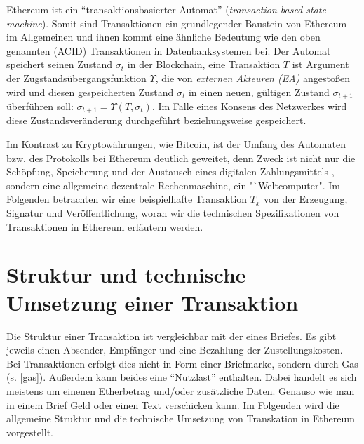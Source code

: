 \documentclass[runningheads]{llncs}
\begin{document}
Ethereum ist ein "`transaktionsbasierter Automat"' (\textit{transaction-based state machine}). Somit sind Transaktionen ein grundlegender Baustein von Ethereum im Allgemeinen und ihnen kommt eine ähnliche Bedeutung wie den oben genannten (ACID) Transaktionen in Datenbanksystemen bei. Der Automat speichert seinen Zustand $ \sigma_t $ in der Blockchain, eine Transaktion $ T $ ist Argument der Zugstandsübergangsfunktion $ \Upsilon $, die von \textit{externen Akteuren (EA)} angestoßen wird und diesen gespeicherten Zustand $ \sigma_t $ in einen neuen, gültigen Zustand $ \sigma_{t + 1} $ überführen soll: $\sigma_{t+1} = \Upsilon(T, \sigma_t) $. Im Falle eines Konsens des Netzwerkes wird diese Zustandsveränderung durchgeführt beziehungsweise gespeichert.

Im Kontrast zu Kryptowährungen, wie Bitcoin, ist der Umfang des Automaten bzw. des Protokolls bei Ethereum deutlich geweitet, denn Zweck ist nicht nur die Schöpfung, Speicherung und der Austausch eines digitalen Zahlungsmittels \cite{nakamoto_bitcoin_nodate}, sondern eine allgemeine dezentrale Rechenmaschine, ein "`Weltcomputer".  \cite[S. 1-4]{wood_ethereum/yellowpaper_2019} Im Folgenden betrachten wir eine beispielhafte Transaktion $ T_x $ von der Erzeugung, Signatur und Veröffentlichung, woran wir die technischen Spezifikationen von Transaktionen in Ethereum erläutern werden.

\section{Struktur und technische Umsetzung einer Transaktion}
Die Struktur einer Transaktion ist vergleichbar mit der eines Briefes. Es gibt jeweils einen Absender, Empfänger und eine Bezahlung der Zustellungskosten. Bei Transaktionen erfolgt dies nicht in Form einer Briefmarke, sondern durch Gas (s. \ref{gas}). Außerdem kann beides eine "`Nutzlast"' \cite[S. 108]{antonopoulos_mastering_2019} enthalten. Dabei handelt es sich meistens um einenen Etherbetrag und/oder zusätzliche Daten. Genauso wie man in einem Brief Geld oder einen Text verschicken kann. Im Folgenden wird die allgemeine Struktur und die technische Umsetzung von Transkation in Ethereum vorgestellt.
\end{document}
